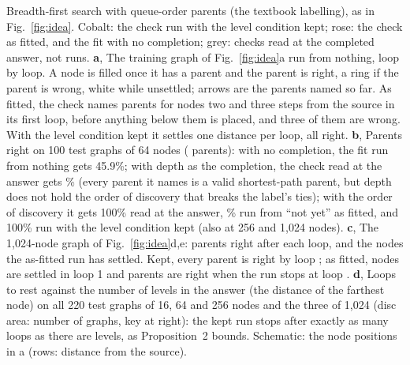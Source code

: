  Breadth-first search with queue-order parents (the textbook
labelling), as in Fig.~\ref{fig:idea}. Cobalt: the check run with the level condition kept; rose: the check
as fitted, and the fit with no completion; grey: checks read at the completed answer, not runs. \textbf{a}, The training
graph of Fig.~\ref{fig:idea}a run from nothing, loop by loop. A node is filled once it has a parent and the parent is right, a ring
if the parent is wrong, white while unsettled; arrows are the parents named so far. As fitted, the check names parents
for nodes two and three steps from the source in its first loop, before anything below them is placed, and three of
them are wrong. With the level condition kept it settles one distance per loop, all right. \textbf{b}, Parents right on
100 test graphs of 64 nodes ( parents): with no completion, the fit run from nothing gets 45.9\%; with depth as the
completion, the check read at the answer gets \% (every parent it names is a valid shortest-path parent, but depth
does not hold the order of discovery that breaks the label's ties); with the order of discovery it gets 100\% read at
the answer, \% run from ``not yet'' as fitted, and 100\% run with the level condition kept (also at 256 and 1,024
nodes). \textbf{c}, The 1,024-node graph of Fig.~\ref{fig:idea}d,e: parents right after each loop, and the nodes the as-fitted run has
settled. Kept, every parent is right by loop ; as fitted,  nodes are settled in loop 1 and
 parents are right when the run stops at loop . \textbf{d}, Loops to rest against the number of levels in the answer (the distance of
the farthest node) on all 220 test graphs of 16, 64 and 256 nodes and the three of 1,024 (disc area: number of graphs, key at right):
the kept run stops after exactly as many loops as there are levels, as Proposition~2 bounds. Schematic: the node
positions in a (rows: distance from the source).
